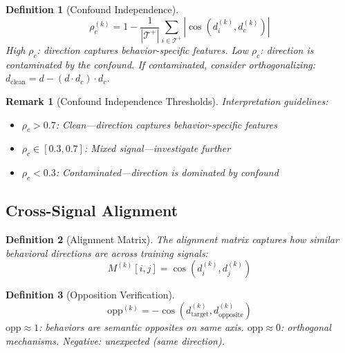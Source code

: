 \documentclass[11pt]{article}
\newtheorem{definition}{Definition}[section]
\newtheorem{remark}{Remark}[section]
\begin{document}
\begin{definition}[Confound Independence]
\begin{equation}
\rho^{(k)}_c = 1 - \frac{1}{|\mathcal{T}^+|} \sum_{i \in \mathcal{T}^+} \left|\cos(d^{(k)}_i, d^{(k)}_c)\right|
\end{equation}
High $\rho_c$: direction captures behavior-specific features. Low $\rho_c$: direction is contaminated by the confound. If contaminated, consider orthogonalizing: $d_{\text{clean}} = d - (d \cdot d_c) \cdot d_c$.
\end{definition}

\begin{remark}[Confound Independence Thresholds]
Interpretation guidelines:
\begin{itemize}[nosep]
\item $\rho_c > 0.7$: Clean---direction captures behavior-specific features
\item $\rho_c \in [0.3, 0.7]$: Mixed signal---investigate further
\item $\rho_c < 0.3$: Contaminated---direction is dominated by confound
\end{itemize}
\end{remark}

\subsection{Cross-Signal Alignment}

\begin{definition}[Alignment Matrix]
The alignment matrix captures how similar behavioral directions are across training signals:
\begin{equation}
M^{(k)}[i, j] = \cos(d^{(k)}_i, d^{(k)}_j)
\end{equation}
\end{definition}

\begin{definition}[Opposition Verification]
\begin{equation}
\text{opp}^{(k)} = -\cos(d^{(k)}_{\text{target}}, d^{(k)}_{\text{opposite}})
\end{equation}
$\text{opp} \approx 1$: behaviors are semantic opposites on same axis. $\text{opp} \approx 0$: orthogonal mechanisms. Negative: unexpected (same direction).
\end{definition}
\end{document}
